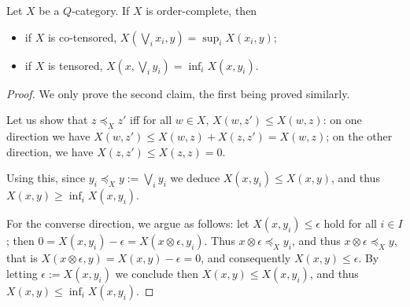\begin{lemma}\label{lemma:supinf}
Let $X$ be a $Q$-category. If $X$ is order-complete, then 
\begin{itemize}
\item if $X$ is co-tensored, $X(\bigvee_{i}x_{i},y)=  \sup_{i}X(x_{i},y) $;
\item if $X$ is tensored, $
X(x,\bigvee_{i}y_{i})=  \inf_{i}X(x,y_{i})$.

\end{itemize}
\end{lemma}
\begin{proof}
We only prove the second claim, the first being proved similarly.

 Let us show that $z\preceq_{X}z'$ iff for all $w\in X$, $X(w,z')\leq X(w,z)$: 
 on one direction we have $X(w,z')\leq X(w,z)+X(z,z')=X(w,z)$; on the other direction, 
 we have $X(z,z')\leq X(z,z)=0$. 
 
 Using this, since $y_{i}\preceq_{X}y:=\bigvee_{i}y_{i}$ we deduce 
 $X(x,y_{i})\leq X(x,y)$, and thus $X(x,y)\geq \inf_{i}X(x,y_{i})$. 
 
 
 For the converse direction, we argue as follows: let $X(x,y_{i})\leq \epsilon$ hold for all $i\in I$; then $0=X(x,y_{i})-\epsilon= X(x\otimes\epsilon,y_{i})$. Thus $x\otimes\epsilon\preceq_{X}y_{i}$, and thus
 $x\otimes\epsilon\preceq_{X}y$, that is $X(x\otimes\epsilon,y)=X(x,y)-\epsilon=0$, and consequently $X(x,y)\leq \epsilon$. 
 By letting $\epsilon:=X(x,y_{i})$ we conclude then $X(x,y)\leq X(x,y_{i})$, and thus $X(x,y)\leq \inf_{i}X(x,y_{i})$.
 
  
%
% 
%
% 
% 
% 
% 
 


\end{proof}

